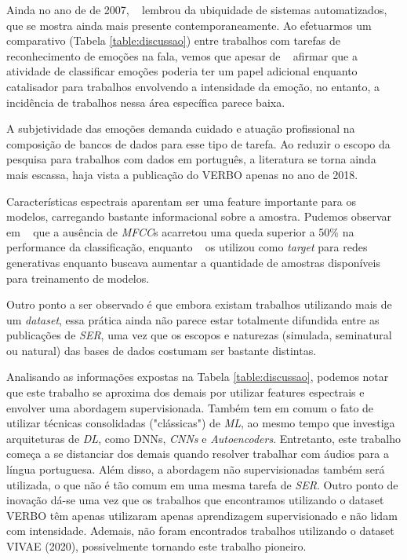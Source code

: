 Ainda no ano de de 2007, ~\cite{32.32} lembrou da ubiquidade de sistemas automatizados, que se mostra ainda mais presente contemporaneamente. Ao efetuarmos um comparativo (Tabela \ref{table:discussao}) entre trabalhos com tarefas de reconhecimento de emoções na fala, vemos que apesar de ~\cite{14} afirmar que a atividade de classificar emoções poderia ter um papel adicional enquanto catalisador para trabalhos envolvendo a intensidade da emoção, no entanto, a incidência de trabalhos nessa área específica parece baixa.

A subjetividade das emoções demanda cuidado e atuação profissional na composição de bancos de dados para esse tipo de tarefa. Ao reduzir o escopo da pesquisa para trabalhos com dados em português, a literatura se torna ainda mais escassa, haja vista a publicação do VERBO apenas no ano de 2018.

Características espectrais aparentam ser uma feature importante para os modelos, carregando bastante informacional sobre a amostra. Pudemos observar em ~\cite{11} que a ausência de \textit{MFCC}s acarretou uma queda superior a 50\% na performance da classificação, enquanto ~\cite{34} os utilizou como \textit{target} para redes generativas enquanto buscava aumentar a quantidade de amostras disponíveis para treinamento de modelos.

Outro ponto a ser observado é que embora existam trabalhos utilizando mais de um \textit{dataset}, essa prática ainda não parece estar totalmente difundida entre as publicações de \textit{SER}, uma vez que os escopos e naturezas (simulada, seminatural ou natural) das bases de dados costumam ser bastante distintas.

Analisando as informações expostas na Tabela \ref{table:discussao}, podemos notar que este trabalho se aproxima dos demais por utilizar features espectrais e envolver uma abordagem supervisionada. Também tem em comum o fato de utilizar técnicas consolidadas ("clássicas") de \textit{ML}, ao mesmo tempo que investiga arquiteturas de \textit{DL}, como DNNs, \textit{CNNs} e \textit{Autoencoders}. Entretanto, este trabalho começa a se distanciar dos demais quando resolver trabalhar com áudios para a língua portuguesa. Além disso, a abordagem não supervisionadas também será utilizada, o que não é tão comum em uma mesma tarefa de \textit{SER}. Outro ponto de inovação dá-se uma vez que os trabalhos que encontramos utilizando o dataset VERBO têm apenas utilizaram apenas aprendizagem supervisionado e não lidam com intensidade. Ademais, não foram encontrados trabalhos utilizando o dataset VIVAE (2020), possivelmente tornando este trabalho pioneiro.

